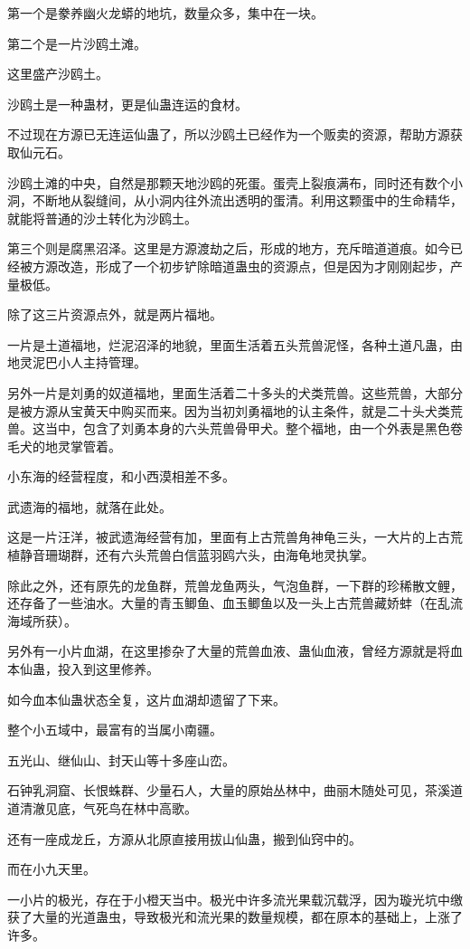 \begin{this_body}
第一个是豢养幽火龙蟒的地坑，数量众多，集中在一块。

第二个是一片沙鸥土滩。

这里盛产沙鸥土。

沙鸥土是一种蛊材，更是仙蛊连运的食材。

不过现在方源已无连运仙蛊了，所以沙鸥土已经作为一个贩卖的资源，帮助方源获取仙元石。

沙鸥土滩的中央，自然是那颗天地沙鸥的死蛋。蛋壳上裂痕满布，同时还有数个小洞，不断地从裂缝间，从小洞内往外流出透明的蛋清。利用这颗蛋中的生命精华，就能将普通的沙土转化为沙鸥土。

第三个则是腐黑沼泽。这里是方源渡劫之后，形成的地方，充斥暗道道痕。如今已经被方源改造，形成了一个初步铲除暗道蛊虫的资源点，但是因为才刚刚起步，产量极低。

除了这三片资源点外，就是两片福地。

一片是土道福地，烂泥沼泽的地貌，里面生活着五头荒兽泥怪，各种土道凡蛊，由地灵泥巴小人主持管理。

另外一片是刘勇的奴道福地，里面生活着二十多头的犬类荒兽。这些荒兽，大部分是被方源从宝黄天中购买而来。因为当初刘勇福地的认主条件，就是二十头犬类荒兽。这当中，包含了刘勇本身的六头荒兽骨甲犬。整个福地，由一个外表是黑色卷毛犬的地灵掌管着。

小东海的经营程度，和小西漠相差不多。

武遗海的福地，就落在此处。

这是一片汪洋，被武遗海经营有加，里面有上古荒兽角神龟三头，一大片的上古荒植静音珊瑚群，还有六头荒兽白信蓝羽鸥六头，由海龟地灵执掌。

除此之外，还有原先的龙鱼群，荒兽龙鱼两头，气泡鱼群，一下群的珍稀散文鲤，还存备了一些油水。大量的青玉鲫鱼、血玉鲫鱼以及一头上古荒兽藏娇蚌（在乱流海域所获）。

另外有一小片血湖，在这里掺杂了大量的荒兽血液、蛊仙血液，曾经方源就是将血本仙蛊，投入到这里修养。

如今血本仙蛊状态全复，这片血湖却遗留了下来。

整个小五域中，最富有的当属小南疆。

五光山、继仙山、封天山等十多座山峦。

石钟乳洞窟、长恨蛛群、少量石人，大量的原始丛林中，曲丽木随处可见，茶溪道道清澈见底，气死鸟在林中高歌。

还有一座成龙丘，方源从北原直接用拔山仙蛊，搬到仙窍中的。

而在小九天里。

一小片的极光，存在于小橙天当中。极光中许多流光果载沉载浮，因为璇光坑中缴获了大量的光道蛊虫，导致极光和流光果的数量规模，都在原本的基础上，上涨了许多。


\end{this_body}
